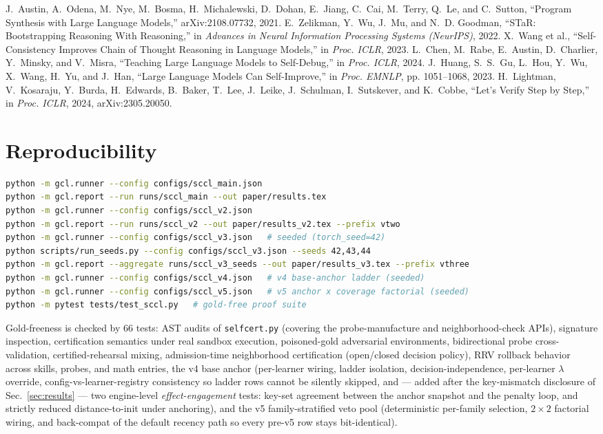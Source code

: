 \documentclass[10pt,conference]{IEEEtran}
\begin{document}
\begin{thebibliography}{99}
 J.~Austin, A.~Odena, M.~Nye, M.~Bosma, H.~Michalewski, D.~Dohan, E.~Jiang, C.~Cai, M.~Terry, Q.~Le, and C.~Sutton, ``Program Synthesis with Large Language Models,'' arXiv:2108.07732, 2021.
 E.~Zelikman, Y.~Wu, J.~Mu, and N.~D. Goodman, ``STaR: Bootstrapping Reasoning With Reasoning,'' in \emph{Advances in Neural Information Processing Systems (NeurIPS)}, 2022.
 X.~Wang et al., ``Self-Consistency Improves Chain of Thought Reasoning in Language Models,'' in \emph{Proc. ICLR}, 2023.
 L.~Chen, M.~Rabe, E.~Austin, D.~Charlier, Y.~Minsky, and V.~Misra, ``Teaching Large Language Models to Self-Debug,'' in \emph{Proc. ICLR}, 2024.
 J.~Huang, S.~S.~Gu, L.~Hou, Y.~Wu, X.~Wang, H.~Yu, and J.~Han, ``Large Language Models Can Self-Improve,'' in \emph{Proc. EMNLP}, pp. 1051--1068, 2023.
 H.~Lightman, V.~Kosaraju, Y.~Burda, H.~Edwards, B.~Baker, T.~Lee, J.~Leike, J.~Schulman, I.~Sutskever, and K.~Cobbe, ``Let's Verify Step by Step,'' in \emph{Proc. ICLR}, 2024, arXiv:2305.20050.
\end{thebibliography}

\section{Reproducibility}
\begin{lstlisting}[language=bash]
python -m gcl.runner --config configs/sccl_main.json
python -m gcl.report --run runs/sccl_main --out paper/results.tex
python -m gcl.runner --config configs/sccl_v2.json
python -m gcl.report --run runs/sccl_v2 --out paper/results_v2.tex --prefix vtwo
python -m gcl.runner --config configs/sccl_v3.json   # seeded (torch_seed=42)
python scripts/run_seeds.py --config configs/sccl_v3.json --seeds 42,43,44
python -m gcl.report --aggregate runs/sccl_v3_seeds --out paper/results_v3.tex --prefix vthree
python -m gcl.runner --config configs/sccl_v4.json   # v4 base-anchor ladder (seeded)
python -m gcl.runner --config configs/sccl_v5.json   # v5 anchor x coverage factorial (seeded)
python -m pytest tests/test_sccl.py   # gold-free proof suite
\end{lstlisting}
Gold-freeness is checked by 66 tests: AST audits of \texttt{selfcert.py} (covering the probe-manufacture and neighborhood-check APIs), signature inspection, certification semantics under real sandbox execution, poisoned-gold adversarial environments, bidirectional probe cross-validation, certified-rehearsal mixing, admission-time neighborhood certification (open/closed decision policy), RRV rollback behavior across skills, probes, and math entries, the v4 base anchor (per-learner wiring, ladder isolation, decision-independence, per-learner $\lambda$ override, config-vs-learner-registry consistency so ladder rows cannot be silently skipped, and --- added after the key-mismatch disclosure of Sec.~\ref{sec:results} --- two engine-level \emph{effect-engagement} tests: key-set agreement between the anchor snapshot and the penalty loop, and strictly reduced distance-to-init under anchoring), and the v5 family-stratified veto pool (deterministic per-family selection, $2\times2$ factorial wiring, and back-compat of the default recency path so every pre-v5 row stays bit-identical).
\end{document}
